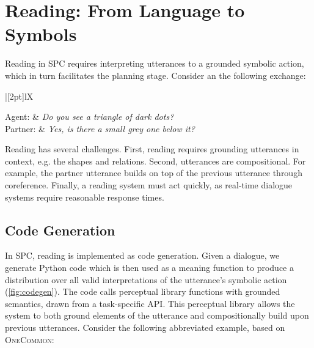 \documentclass[11pt]{article}
\newcommand{\system}{SPC}
\newenvironment{Dialogue}[1][\small]{
    #1
    \def\arraystretch{1.3}
    \setlength\tabcolsep{7pt}
    \taburulecolor{lightgray}
    \vspace{.8em}
    \noindent
    \begin{tabu} to \columnwidth {|[2pt]lX}
}{
    \end{tabu}
    \vspace{.5em}
}
\newcommand{\Partner}[1]{Partner: & \UserUtt{#1} \\}
\newcommand{\AgentSay}[1]{Agent: & \AgentUtt{#1} \\}
\newcommand{\UserUtt}[1]{\textit{#1}}
\newcommand{\AgentUtt}[1]{\textit{#1}}
\begin{document}
\section{Reading: From Language to Symbols}
\label{sec:reading}
Reading in \system{} requires interpreting utterances to a grounded symbolic action, which in turn facilitates the planning stage. Consider an the following exchange:
\vspace{-0.15em}

\begin{Dialogue}
    \AgentSay{Do you see a triangle of dark dots?}
    \Partner{Yes, is there a small grey one below it?}
\end{Dialogue}%
\vspace{-0.5em}

Reading has several challenges. First, reading requires grounding utterances in context, e.g. the shapes and relations. Second, utterances are compositional. For example, the partner utterance builds on top of the previous utterance through coreference.
Finally, a reading system must act quickly, as real-time dialogue systems require reasonable response times.

\subsection{Code Generation}
\label{sec:code-generation}

In \system{}, reading is implemented as code generation. Given a dialogue, we generate Python code which is then used as a meaning function to produce a distribution over all valid interpretations of the utterance's symbolic action (\autoref{fig:codegen}).
The code calls perceptual library functions with grounded semantics, drawn from a task-specific API.
This perceptual library allows the system to both ground elements of the utterance and compositionally build upon previous utterances. Consider the following abbreviated example, based on \textsc{OneCommon}:
\end{document}
